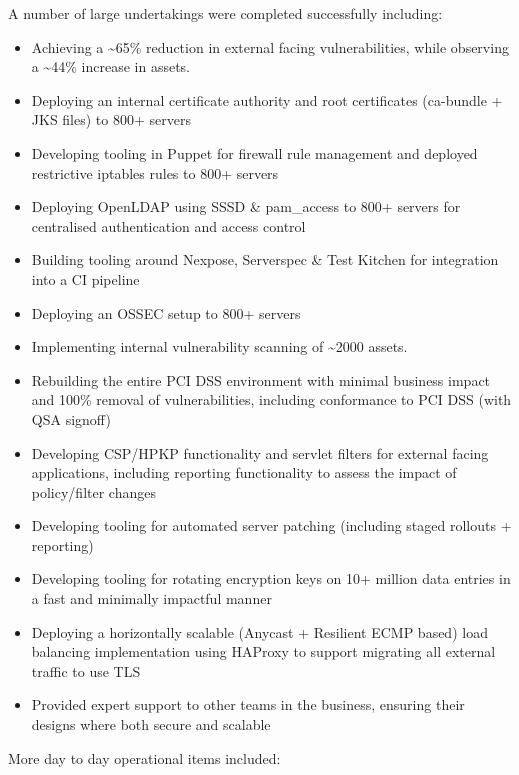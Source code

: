 A number of large undertakings were completed successfully including:

\begin{itemize}
\itemsep1pt\parskip0pt
\item
  Achieving a \textasciitilde{}65\% reduction in external facing
  vulnerabilities, while observing a \textasciitilde{}44\% increase in
  assets.
\item
  Deploying an internal certificate authority and root certificates
  (ca-bundle + JKS files) to 800+ servers
\item
  Developing tooling in Puppet for firewall rule management and deployed
  restrictive iptables rules to 800+ servers
\item
  Deploying OpenLDAP using SSSD \& pam\_access to 800+ servers for
  centralised authentication and access control
\item
  Building tooling around Nexpose, Serverspec \& Test Kitchen for
  integration into a CI pipeline
\item
  Deploying an OSSEC setup to 800+ servers
\item
  Implementing internal vulnerability scanning of \textasciitilde{}2000
  assets.
\item
  Rebuilding the entire PCI DSS environment with minimal business impact
  and 100\% removal of vulnerabilities, including conformance to PCI DSS
  (with QSA signoff)
\item
  Developing CSP/HPKP functionality and servlet filters for external
  facing applications, including reporting functionality to assess the
  impact of policy/filter changes
\item
  Developing tooling for automated server patching (including staged
  rollouts + reporting)
\item
  Developing tooling for rotating encryption keys on 10+ million data
  entries in a fast and minimally impactful manner
\item
  Deploying a horizontally scalable (Anycast + Resilient ECMP based)
  load balancing implementation using HAProxy to support migrating all
  external traffic to use TLS
\item
  Provided expert support to other teams in the business, ensuring their
  designs where both secure and scalable
\end{itemize}

More day to day operational items included:

